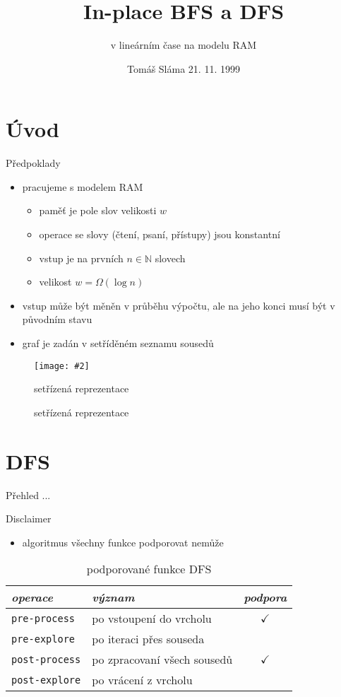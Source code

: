\documentclass{beamer}
\title{In-place BFS a DFS}
\subtitle{v lineárním čase na modelu RAM}
\date{Tomáš Sláma \hfill 21. 11. 1999} %
\makeatletter
\newcommand{\fitimage}[2][\@nil]{
	\begin{figure}
		\begin{adjustbox}{width=0.9\textwidth, totalheight=\textheight-2\baselineskip-2\baselineskip,keepaspectratio}
			\texttt{[image: \#2]}
		\end{adjustbox}
		\def\tmp{#1}%
	 \ifx\tmp\@nnil
			\else
			\caption{#1}
		\fi
	\end{figure}
}
\makeatother
\begin{document}
	\begin{frame}
		\maketitle
	\end{frame}
	
	\section{Úvod}
	\begin{frame}{Předpoklady}
		\begin{itemize}
			\item pracujeme s modelem RAM
			\begin{itemize}
				\item paměť je pole slov velikosti $w$
				\item operace se slovy (čtení, psaní, přístupy) jsou konstantní
				\item vstup je na prvních $n \in \mathbb{N}$ slovech
				\item velikost $w = \Omega\left(\log n\right)$
			\end{itemize}
			\vfill
			\item vstup může být měněn v průběhu výpočtu, ale na jeho konci musí být v původním stavu
			\vfill
			\item graf je zadán v setříděném seznamu sousedů
		\end{itemize}

		\fitimage[setřízená reprezentace]{images/sorted.png}
	\end{frame}

	\section{DFS}
	\begin{frame}{Přehled}
		...
	\end{frame}

	\begin{frame}{Disclaimer}
		\begin{itemize}
			\item algoritmus všechny funkce podporovat nemůže
		\end{itemize}

		\begin{table}
			\centering
			\begin{tabular}{llc}
				\toprule
				\emph{operace} & \emph{význam} & \emph{podpora} \\
				\midrule
				\texttt{pre-process} & po vstoupení do vrcholu & $\checkmark$ \\
				\texttt{pre-explore} & po iteraci přes souseda &  \\
				\texttt{post-process} & po zpracovaní všech sousedů & $\checkmark$ \\
				\texttt{post-explore} & po vrácení z vrcholu &  \\
				\bottomrule
			\end{tabular}
			\caption{podporované funkce DFS}
		\end{table}
	\end{frame}
\end{document}
